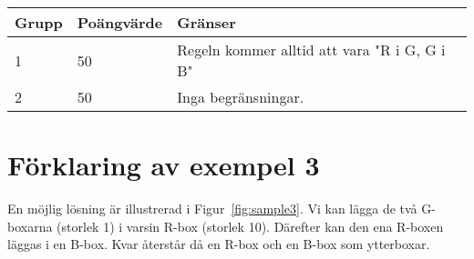 \noindent
\begin{tabular}{| l | l | l |}
\hline
Grupp & Poängvärde & Gränser \\ \hline
1     & 50         & Regeln kommer alltid att vara "R i G, G i B" \\ \hline
2     & 50         & Inga begränsningar. \\ \hline
\end{tabular}

\section*{Förklaring av exempel 3}
En möjlig lösning är illustrerad i Figur~\ref{fig:sample3}.
Vi kan lägga de två G-boxarna (storlek 1) i varsin R-box (storlek 10).
Därefter kan den ena R-boxen läggas i en B-box.
Kvar återstår då en R-box och en B-box som ytterboxar.
